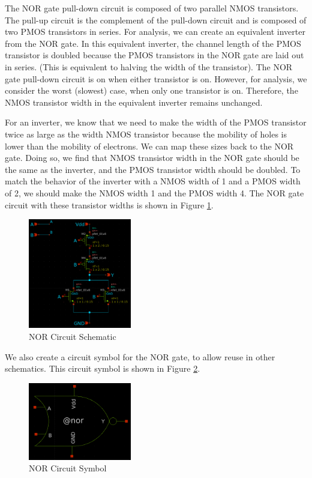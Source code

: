 \documentclass[fleqn]{article}
\begin{document}
	The NOR gate pull-down circuit is composed of two parallel NMOS transistors. The pull-up circuit is the complement of the pull-down circuit and is composed of two PMOS transistors in series. For analysis, we can create an equivalent inverter from the NOR gate. In this equivalent inverter, the channel length of the PMOS transistor is doubled because the PMOS transistors in the NOR gate are laid out in series. (This is equivalent to halving the width of the transistor). The NOR gate pull-down circuit is on when either transistor is on. However, for analysis, we consider the worst (slowest) case, when only one transistor is on. Therefore, the NMOS transistor width in the equivalent inverter remains unchanged.
	
	For an inverter, we know that we need to make the width of the PMOS transistor twice as large as the width NMOS transistor because the mobility of holes is lower than the mobility of electrons. We can map these sizes back to the NOR gate. Doing so, we find that NMOS transistor width in the NOR gate should be the same as the inverter, and the PMOS transistor width should be doubled. To match the behavior of the inverter with a NMOS width of 1 and a PMOS width of 2, we should make the NMOS width 1 and the PMOS width 4. The NOR gate circuit with these transistor widths is shown in Figure \ref{fig::nor_schematic}.
	
	\begin{figure}[H]
		\centerline{\includegraphics[width=0.4\textwidth]{nor_schematic.png}}
		\caption{NOR Circuit Schematic}
		\label{fig::nor_schematic}
	\end{figure}
	
	\noindent We also create a circuit symbol for the NOR gate, to allow reuse in other schematics. This circuit symbol is shown in Figure \ref{fig::nor_symbol}.
	
	\begin{figure}[H]
		\centerline{\includegraphics[width=0.4\textwidth]{nor_symbol.png}}
		\caption{NOR Circuit Symbol}
		\label{fig::nor_symbol}
	\end{figure}
\end{document}
